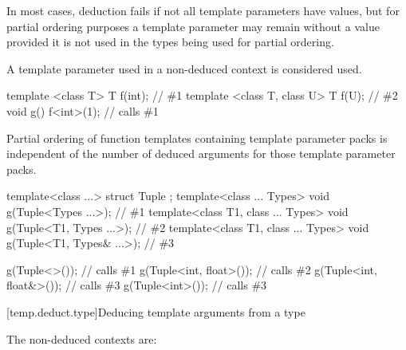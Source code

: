 \documentclass{wg21}
\begin{document}
\pnum
In most cases,
deduction fails if not all template parameters have values,
but for partial ordering purposes a template
parameter may remain without a value provided it is not used in the
types being used for partial ordering.
\begin{note}
    A template parameter used in a non-deduced context is considered used.
\end{note}
\begin{example}
    \begin{codeblock}
        template <class T> T f(int);            // \#1
        template <class T, class U> T f(U);     // \#2
        void g() {
            f<int>(1);                            // calls \#1
        }
    \end{codeblock}
\end{example}

\pnum
\begin{note}
    Partial ordering of function templates containing
    template parameter packs is independent of the number of deduced arguments
    for those template parameter packs.
\end{note}
\begin{example}
    \begin{codeblock}
        template<class ...> struct Tuple { };
        template<class ... Types> void g(Tuple<Types ...>);                 // \#1
        template<class T1, class ... Types> void g(Tuple<T1, Types ...>);   // \#2
        template<class T1, class ... Types> void g(Tuple<T1, Types& ...>);  // \#3

        g(Tuple<>());                   // calls \#1
        g(Tuple<int, float>());         // calls \#2
        g(Tuple<int, float&>());        // calls \#3
        g(Tuple<int>());                // calls \#3
    \end{codeblock}
\end{example}


[temp.deduct.type]{Deducing template arguments from a type}

\pnum
The non-deduced contexts are:
\end{document}
